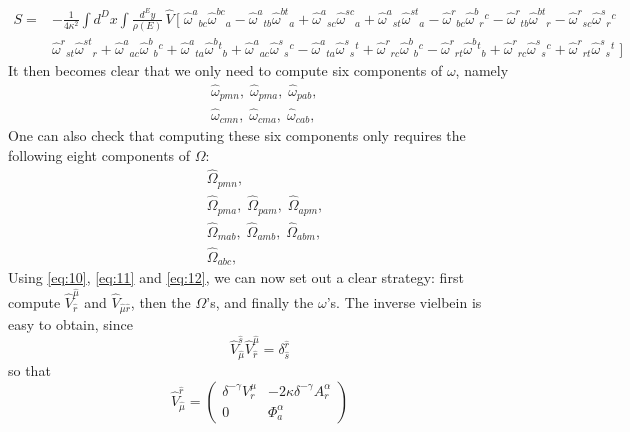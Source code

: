 \documentclass{article}
\begin{document}
\begin{equation} \label{eq:17}
\boxed{
  \begin{aligned}
S=&-\frac{1}{4\kappa^{2}}\int d^{D}x\int\frac{d^{E}y}{\rho(E)}\,\hat V\,\Big[\;
\hat\omega^a{}_{b  c}\hat \omega^{bc}{}_a
-\hat \omega^a{}_{t  b}\hat \omega^{bt}{}_a
+\hat\omega^a{}_{s  c}\hat\omega^{sc}{}_a
+\hat\omega^a{}_{s  t}\hat\omega^{st}{}_a
-\hat\omega^r{}_{b  c}\hat\omega^{b}{}_r{}^c
-\hat\omega^r{}_{t  b}\hat\omega^{bt}{}_r
-\hat\omega^r{}_{s  c}\hat\omega^{s}{}_r{}^c \\
&\hat\omega^r{}_{s  t}\hat\omega^{st}{}_r
+\hat\omega^a{}_{ac}\hat\omega^b{}_b{}^c
+\hat\omega^a{}_{ta}\hat\omega^b{}^t{}_b
+\hat\omega^a{}_{ac}\hat\omega^s{}_s{}^c 
-\hat\omega^a{}_{ta}\hat\omega^s{}_s{}^t
+\hat\omega^r{}_{rc}\hat\omega^b{}_b{}^c
-\hat\omega^r{}_{rt}\hat\omega^b{}^t{}_b
+\hat\omega^r{}_{rc}\hat\omega^s{}_s{}^c
+\hat\omega^r{}_{rt}\hat\omega^s{}_s{}^t
\;\Big]
\end{aligned}}
\end{equation}
It then becomes clear that we only need to compute six components of $\omega$, namely
\begin{align*}
    &\hat \omega_{pmn}, \;
    \hat \omega_{pma}, \;
    \hat \omega_{pab},\\
    &\hat \omega_{cmn},\;
    \hat \omega_{cma},\;
    \hat \omega_{cab},\;
\end{align*}
One can also check that computing these six components only requires the following eight components of $\Omega$:
\begin{align*}
    &\hat \Omega_{pmn},\\
    &\hat \Omega_{pma},\;
    \hat \Omega_{pam},\;
    \hat \Omega_{apm},\\
    &\hat \Omega_{mab},\;
    \hat \Omega_{amb},\;
    \hat \Omega_{abm},\\
    &\hat \Omega_{abc},
\end{align*}
Using \eqref{eq:10}, \eqref{eq:11} and \eqref{eq:12}, we can now set out a clear strategy: first compute $\hat V^{\hat \mu}_{\hat r}$ and $\hat V_{\hat \mu\hat r}$, then the $\Omega$'s, and finally the $\omega$'s. The inverse vielbein is easy to obtain, since
\begin{equation*}
    \hat V_{\hat \mu}^{\hat s}\hat V^{\hat \mu}_{\hat r} = \delta^{\hat r}_{\hat s}
\end{equation*}
so that
\begin{equation}
    \hat V^{\hat r}_{\hat \mu} = \begin{pmatrix} 
        \delta^{ - \gamma} V^\mu_r &  -2 \kappa\delta^{ - \gamma} A^{\alpha }_r \\ 0 & \Phi^\alpha_a
    \end{pmatrix}
\end{equation}
\end{document}
